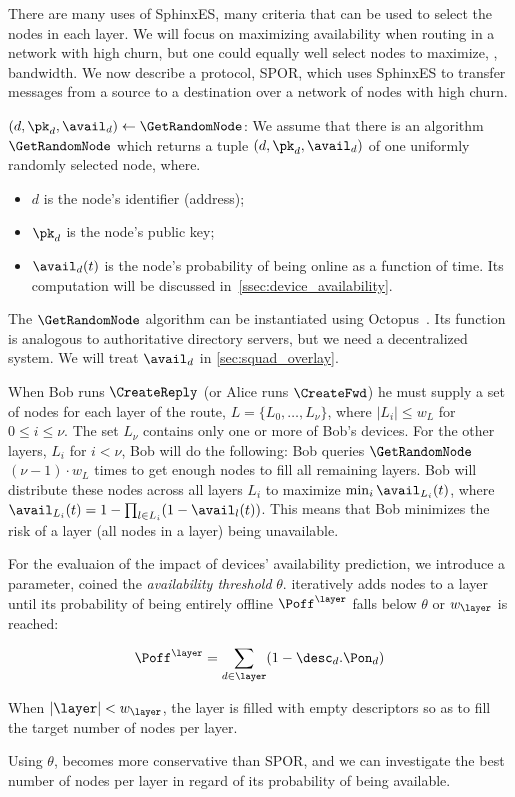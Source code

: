 There are many uses of SphinxES, many criteria that can be used to select the 
nodes in each layer.
We will focus on maximizing availability when routing in a network with high 
churn, but one could equally well select nodes to maximize, \eg, bandwidth.
We now describe a protocol, \ac{SPOR}, which uses SphinxES to transfer messages 
from a source to a destination over a network of nodes with high churn.

\((d, \pk_d, \avail_d)\gets \GetRandomNode\): We assume that there is an 
algorithm \(\GetRandomNode\) which returns a tuple \((d, \pk_d, \avail_d)\) of 
one uniformly randomly selected node, where.
\begin{itemize}
  \item \(d\) is the node's identifier (address);
  \item \(\pk_d\) is the node's public key;
  \item  \(\avail_d(t)\) is the node's probability of being online as a function of time. 
  Its computation will be discussed in~\ref{ssec:device_availability}.
\end{itemize}
The \(\GetRandomNode\) algorithm can be instantiated using \eg
Octopus~\cite{Octopus}. Its function is analogous to  authoritative 
directory servers, but we need a decentralized system. We will treat 
\(\avail_d\) in \cref{sec:squad_overlay}.

When Bob runs \(\CreateReply\) (or Alice runs \(\CreateFwd\)) he must supply a 
set of nodes for each layer of the route, \(L = \{L_0, \dotsc, L_\nu\}\), where 
\(|L_i| \leq w_L\) for \(0\leq i\leq \nu\).
The set \(L_\nu\) contains only one or more of Bob's devices.
For the other layers, \(L_i\) for \(i < \nu\), Bob will do the following:
Bob queries \(\GetRandomNode\) \((\nu-1)\cdot w_L\) times to get enough nodes 
to fill all remaining layers.
Bob will distribute these nodes across all layers \(L_i\) to maximize \(\min_i 
  \avail_{L_i}(t)\), where \(\avail_{L_i}(t) = 1-\prod_{l\in L_i} 
  (1-\avail_l(t))\).
This means that Bob minimizes the risk of a layer (\ie all nodes in a layer) 
being unavailable.

For the evaluaion of the impact of devices' availability prediction, we introduce a parameter, coined the \emph{availability threshold} $\theta$. 
\CreateLayer iteratively adds nodes to a layer \layer until its probability of being entirely offline $\Poff^\layer$ falls below $\theta$ or $w_\layer$ is reached:

$$ \Poff^\layer = \sum\limits_{d \in \layer}(1 - \desc_d.\Pon_d) $$

When $|\layer| < w_\layer$, the layer is filled with empty descriptors so as to fill the target number of nodes per layer.

Using $\theta$, \name becomes more conservative than \ac{SPOR}, and we can investigate the best number of nodes per layer in regard of its probability of being available.
